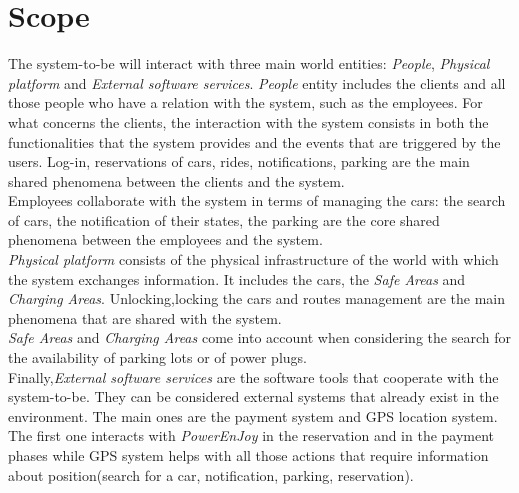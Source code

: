 \documentclass[11pt,a4paper]{report}
\begin{document}
\section{Scope}
The system-to-be will interact with three main world entities: \textit{People}, \textit{Physical platform} and \textit{External software services}.
\textit{People} entity includes the clients and all those people who have a relation with the system, such as the employees.
For what concerns the clients, the interaction with the system consists in both the functionalities that the system provides and the events that are triggered by the users. Log-in, reservations of cars, rides, notifications, parking are the main shared phenomena between the clients and the system.\\Employees collaborate with the system in terms of managing the cars: the search of cars, the notification of their states, the parking are the core shared phenomena between the employees and the system.\\
\textit{Physical platform} consists of the physical infrastructure of the world with which the system exchanges information. It includes the cars, the \textit{Safe Areas} and \textit{Charging Areas}.
Unlocking,locking the cars and routes management are the main phenomena that are shared with the system.\\\textit{Safe Areas} and \textit{Charging Areas} come into account when considering the search for the availability of parking lots or of power plugs.\\Finally,\textit{External software services} are the software tools that cooperate with the system-to-be. They can be considered external systems that already exist in the environment. The main ones are the payment system and GPS location system. The first one interacts with \textit{PowerEnJoy} in the reservation and in the payment phases while GPS system helps with all those actions that require information about position(search for a car, notification, parking, reservation).
\end{document}
